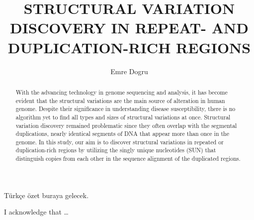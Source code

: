 \documentclass{buthesis}
\title{STRUCTURAL VARIATION DISCOVERY IN REPEAT- AND DUPLICATION-RICH REGIONS}
\author{Emre Dogru}
\begin{document}
\titlepageMS %
\signaturepageMS %

\thispagestyle{plain}
\begin{abstract}
With the advancing technology in genome sequencing and analysis, it has become evident that the structural variations are the main source of alteration in human genome. Despite their significance in understanding disease susceptibility, there is no algorithm yet to find all types and sizes of structural variations at once. Structural variation discovery remained problematic since they often overlap with the segmental duplications, nearly identical segments of DNA that appear more than once in the genome. In this study, our aim is to discover structural variations in repeated or duplication-rich regions by utilizing the singly unique nucleotides (SUN) that distinguish copies from each other in the sequence alignment of the duplicated regions.
\end{abstract}

\begin{ozet}
 T\"urk\c ce \"ozet buraya gelecek. 
\end{ozet}

\begin{ack}
 I acknowledge that \ldots
\end{ack}

\tableofcontents
\listoffigures
\listoftables
\newpage
\newpage
%
\newpage 
\pagestyle{headings}
\makeatother
\end{document}
